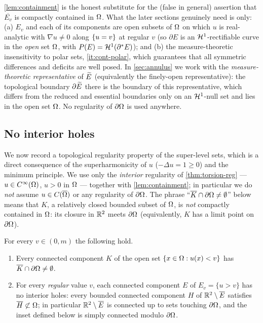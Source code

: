 \begin{remark}\label{rem:containment}
\cref{lem:containment} is the honest substitute for the (false in general)
assertion that $\overline{E_v}$ is compactly contained in $\Omega$. What the
later sections genuinely need is only: \textup{(a)} $E_v$ and each of its
components are open subsets of $\Omega$ on which $u$ is real-analytic with
$\nabla u\neq0$ along $\left\{u=v\right\}$ at regular $v$ (so $\partial E$ is an
$\mathcal{H}^1$-rectifiable curve in the \emph{open} set $\Omega$, with $P(E)=
\mathcal{H}^1(\partial^*E)$); and \textup{(b)} the measure-theoretic insensitivity
to polar sets, \ref{it:cont-polar}, which guarantees that all symmetric
differences and deficits are well posed. In \cref{sec:annulus} we work with
the \emph{measure-theoretic representative} of $\widetilde{E}$ \textup{(}equivalently
the finely-open representative\textup{)}: the topological boundary
$\partial\widetilde{E}$ there is the boundary of this representative, which differs
from the reduced and essential boundaries only on an $\mathcal{H}^1$-null set and
lies in the open set $\Omega$. No regularity of $\partial\Omega$ is used anywhere.
\end{remark}

\subsection{No interior holes}

We now record a topological regularity property of the super-level sets,
which is a direct consequence of the superharmonicity of $u$
($-\Delta u=1\ge0$) and the minimum principle. We use only the
\emph{interior} regularity of \cref{thm:torsion-reg} --- $u\in C^\infty(\Omega)$,
$u>0$ in $\Omega$ --- together with \cref{lem:containment}; in particular we
do \emph{not} assume $u\in C(\overline{\Omega})$ or any regularity of
$\partial\Omega$. The phrase ``$\overline K\cap\partial\Omega\neq\emptyset$''
below means that $K$, a relatively closed bounded subset of $\Omega$, is
\emph{not} compactly contained in $\Omega$: its closure in $\mathbb{R}^2$ meets
$\partial\Omega$ (equivalently, $K$ has a limit point on $\partial\Omega$).

\begin{lemma}\label{lem:noholes}
For every $v\in(0,m)$ the following hold.
\begin{enumerate}[label=\textup{(\roman*)},leftmargin=2.4em]
\item Every connected component $K$ of the open set
$\{x\in\Omega:u(x)<v\}$ has $\overline K\cap\partial\Omega\neq\emptyset$.
\item For every \emph{regular} value $v$, each connected component $E$ of
$E_v=\{u>v\}$ has no interior holes: every bounded connected component $H$
of $\mathbb{R}^2\setminus\overline E$ satisfies $\overline H\not\subset\Omega$; in
particular $\mathbb{R}^2\setminus\overline E$ is connected up to sets touching
$\partial\Omega$, and the inset defined below is simply connected modulo
$\partial\Omega$.
\end{enumerate}
\end{lemma}

